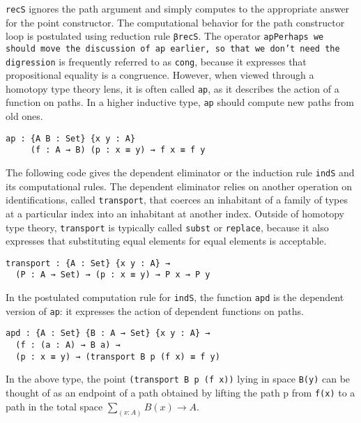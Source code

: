 \documentclass[sigplan,10pt]{acmart}
\begin{document}
{\tt recS} ignores the path argument and simply computes to the appropriate answer for the point constructor. The computational behavior for the path constructor loop is postulated using reduction rule {\tt βrecS}.
The operator \texttt{ap}\texttt{Perhaps we should move the discussion of ap earlier, so that we don't need the digression} is frequently referred to as \texttt{cong}, because it expresses that propositional equality is a congruence.
However, when viewed through a homotopy type theory lens, it is often called \texttt{ap}, as it describes the action of a function on paths.
In a higher inductive type, \texttt{ap} should compute new paths from old ones.
\begin{center}
\begin{BVerbatim}
ap : {A B : Set} {x y : A}
     (f : A → B) (p : x ≡ y) → f x ≡ f y
\end{BVerbatim}
\end{center}

The following code gives the dependent eliminator or the induction rule {\tt indS} and its computational rules.
The dependent eliminator relies on another operation on identifications, called \texttt{transport}, that coerces an inhabitant of a family of types at a particular index into an inhabitant at another index.
Outside of homotopy type theory, \texttt{transport} is typically called \texttt{subst} or \texttt{replace}, because it also expresses that substituting equal elements for equal elements is acceptable.
\begin{center}
\begin{Verbatim}
transport : {A : Set} {x y : A} → 
  (P : A → Set) → (p : x ≡ y) → P x → P y
\end{Verbatim}

\end{center}


In the postulated computation rule for \texttt{indS}, the function {\tt apd} is the dependent version of \texttt{ap}: it expresses the action of dependent functions on paths.
\begin{center}
\begingroup
\begin{Verbatim}
apd : {A : Set} {B : A → Set} {x y : A} → 
  (f : (a : A) → B a) → 
  (p : x ≡ y) → (transport B p (f x) ≡ f y)
\end{Verbatim}
\endgroup
\end{center}

In the above type, the point {\tt (transport B p (f x))} lying in space {\tt B(y)} can be thought of as an endpoint of a path obtained by lifting the path p from {\tt f(x)} to a path in the total space $\sum_{(x:A)} B(x) \rightarrow A$. 
\end{document}
